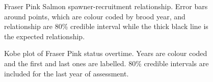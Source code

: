\documentclass[11pt]{book}
\begin{document}
\begin{figure}[htb]

{\centering {} 

}

\caption{Fraser Pink Salmon spawner-recruitment relationship. Error bars around points, which are colour coded by brood year, and relationship are 80\% credible interval while the thick black line is the expected relationship.}\label{fig:fig-SRR}
\end{figure}

\begin{figure}[htb]

{\centering {} 

}

\caption{Kobe plot of Fraser Pink status overtime. Years are colour coded and the first and last ones are labelled. 80\% credible intervals are included for the last year of assessment.}\label{fig:fig-kobe}
\end{figure}
\end{document}
